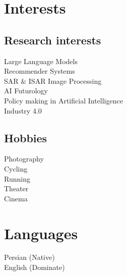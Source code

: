 \documentclass[a4paper]{deedy-resume} %
\begin{document}

\newpage


\begin{minipage}[t]{0.33\textwidth} %


\section{Interests}

\subsection{Research interests}
Large Language Models\\
Recommender Systems\\
SAR \& ISAR Image Processing\\
AI Futurology\\
Policy making in Artificial Intelligence\\
Industry 4.0\\


\sectionspace %

\subsection{Hobbies}
Photography\\
Cycling\\
Running\\
Theater\\
Cinema\\


\sectionspace %

\section{Languages}
Persian (Native)\\
English (Dominate)\\





\sectionspace %




\end{minipage} %
\end{document}
